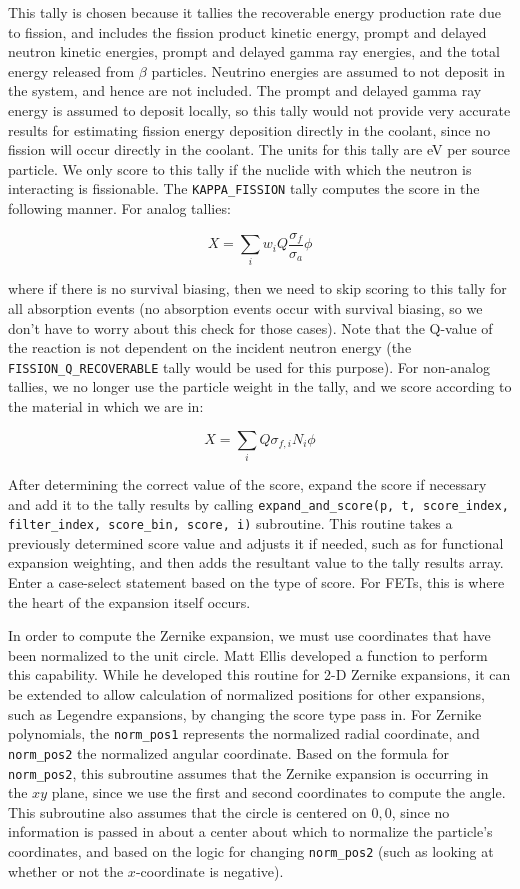 \documentclass[10pt]{article}
\newcommand{\beq}{\begin{equation}}
\newcommand{\eeq}{\end{equation}}
\numberwithin{equation}{section} %
\begin{document}
This tally is chosen because it tallies the recoverable energy production rate due to fission, and includes the fission product kinetic energy, prompt and delayed neutron kinetic energies, prompt and delayed gamma ray energies, and the total energy released from \(\beta\) particles. Neutrino energies are assumed to not deposit in the system, and hence are not included. The prompt and delayed gamma ray energy is assumed to deposit locally, so this tally would not provide very accurate results for estimating fission energy deposition directly in the coolant, since no fission will occur directly in the coolant. The units for this tally are eV per source particle. We only score to this tally if the nuclide with which the neutron is interacting is fissionable. The {\tt KAPPA\_FISSION} tally computes the score in the following manner. For analog tallies:

\beq
X=\sum_{i}w_iQ\frac{\sigma_f}{\sigma_a}\phi
\eeq

where if there is no survival biasing, then we need to skip scoring to this tally for all absorption events (no absorption events occur with survival biasing, so we don't have to worry about this check for those cases). Note that the Q-value of the reaction is not dependent on the incident neutron energy (the {\tt FISSION\_Q\_RECOVERABLE} tally would be used for this purpose). For non-analog tallies, we no longer use the particle weight in the tally, and we score according to the material in which we are in:

\beq
X=\sum_{i}Q\sigma_{f,i}N_i\phi
\eeq

After determining the correct value of the score, expand the score if necessary and add it to the tally results by calling {\tt expand\_and\_score(p, t, score\_index, filter\_index, score\_bin, score, i)} subroutine. This routine takes a previously determined score value and adjusts it if needed, such as for functional expansion weighting, and then adds the resultant value to the tally results array. Enter a case-select statement based on the type of score. For FETs, this is where the heart of the expansion itself occurs. 

In order to compute the Zernike expansion, we must use coordinates that have been normalized to the unit circle. Matt Ellis developed a function to perform this capability. While he developed this routine for 2-D Zernike expansions, it can be extended to allow calculation of normalized positions for other expansions, such as Legendre expansions, by changing the score type pass in. For Zernike polynomials, the {\tt norm\_pos1} represents the normalized radial coordinate, and {\tt norm\_pos2} the normalized angular coordinate. Based on the formula for {\tt norm\_pos2}, this subroutine assumes that the Zernike expansion is occurring in the \(xy\) plane, since we use the first and second coordinates to compute the angle. This subroutine also assumes that the circle is centered on \(0,0\), since no information is passed in about a center about which to normalize the particle's coordinates, and based on the logic for changing {\tt norm\_pos2} (such as looking at whether or not the \(x\)-coordinate is negative). 
\end{document}
